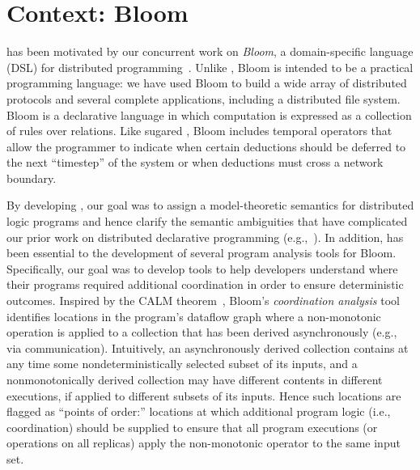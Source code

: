 \section{Context: Bloom}
\lang has been motivated by our concurrent work on \emph{Bloom}, a
domain-specific language (DSL) for distributed programming~\cite{bloom}. Unlike
\lang, Bloom is intended to be a practical programming language: we have used
Bloom to build a wide array of distributed protocols and several complete
applications, including a distributed file system. Bloom is a declarative
language in which computation is expressed as a collection of rules over
relations. Like sugared \lang, Bloom includes temporal operators that allow the
programmer to indicate when certain deductions should be deferred to the next
``timestep'' of the system or when deductions must cross a network
boundary. %

By developing \lang, our goal was to assign a model-theoretic semantics for
distributed logic programs and hence clarify the semantic ambiguities that have
complicated our prior work on distributed declarative programming
(e.g.,~\cite{Mao2009,navarro-oper-sem}). In addition, \lang has been essential
to the development of several program analysis tools for Bloom. Specifically,
our goal was to develop tools to help developers understand where their programs
required additional coordination in order to ensure deterministic
outcomes. Inspired by the CALM theorem~\cite{cidr11,declarative-imperative},
Bloom's \emph{coordination analysis} tool identifies locations in the program's
dataflow graph where a non-monotonic operation is applied to a collection that
has been derived asynchronously (e.g., via communication).  Intuitively, an
asynchronously derived collection contains at any time some nondeterministically
selected subset of its inputs, and a nonmonotonically derived collection may
have different contents in different executions, if applied to different subsets
of its inputs.  Hence such locations are flagged as ``points of order:''
locations at which additional program logic (i.e., coordination) should be
supplied to ensure that all program executions (or operations on all replicas)
apply the non-monotonic operator to the same input set.

